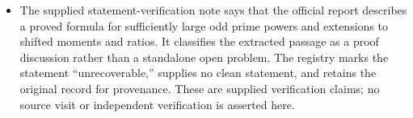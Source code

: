 \documentclass[11pt]{article}
\begin{document}
\begin{itemize}
\item The supplied statement-verification note says that the official report describes a proved formula for sufficiently large odd prime powers and extensions to shifted moments and ratios. It classifies the extracted passage as a proof discussion rather than a standalone open problem. The registry marks the statement ``unrecoverable,'' supplies no clean statement, and retains the original record for provenance. These are supplied verification claims; no source visit or independent verification is asserted here.
\end{itemize}
\end{document}
